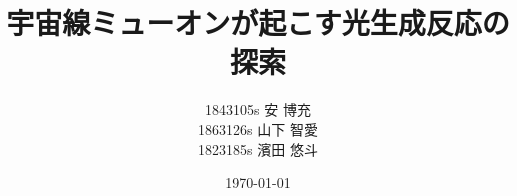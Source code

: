 \documentclass[a4paper,uplatex]{jsreport}
\begin{document}
\title{宇宙線ミューオンが起こす光生成反応の探索}
\author{1843105s 安 博充\\
        1863126s 山下 智愛\\
        1823185s 濱田 悠斗
}
\date{\today} %

\maketitle %
\tableofcontents %













\end{document}

